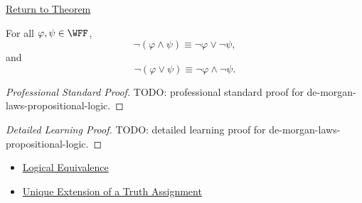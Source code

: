 \newpage
{}
\label{prf:de-morgan-laws-propositional-logic}

\begin{remark*}[Return]
\hyperref[thm:de-morgan-laws-propositional-logic]{Return to Theorem}
\end{remark*}

\begin{theorem*}
For all \(\varphi,\psi\in\WFF\),
\[
\neg(\varphi\land\psi)
\equiv
\neg\varphi\lor\neg\psi,
\]
and
\[
\neg(\varphi\lor\psi)
\equiv
\neg\varphi\land\neg\psi.
\]
\end{theorem*}

\begin{proof}[Professional Standard Proof]
\LRAProofBodyStart
TODO: professional standard proof for de-morgan-laws-propositional-logic.
\end{proof}

\begin{proof}[Detailed Learning Proof]
\LRAProofBodyStart
TODO: detailed learning proof for de-morgan-laws-propositional-logic.
\end{proof}

\begin{remark*}
\end{remark*}

\begin{dependencies}
\begin{itemize}
  \item \hyperref[def:logical-equivalence-propositional-logic]{Logical Equivalence}
  \item \hyperref[thm:unique-extension-truth-assignment-propositional-logic]{Unique Extension of a Truth Assignment}
\end{itemize}
\end{dependencies}

\clearpage
